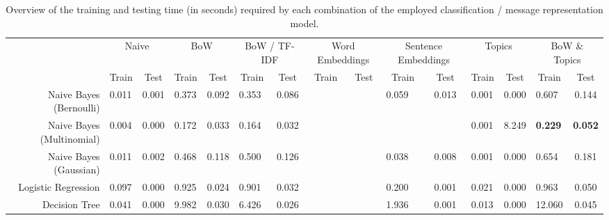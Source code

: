 \documentclass[letterpaper]{article}
\begin{document}
\begin{landscape}
	\begin{table}[t!]
		\centering
		\caption{Overview of the training and testing time (in seconds) required by each combination of the employed classification / message representation model.}
		\label{tb: time}
		\begin{tabular}{@{}r|lclclclclclclc@{}}
			\toprule
			                          & \multicolumn{2}{c}{Naive}         & \multicolumn{2}{c}{BoW}           & \multicolumn{2}{c}{BoW / TF-IDF}  & \multicolumn{2}{c}{Word Embeddings} & \multicolumn{2}{c}{Sentence Embeddings} & \multicolumn{2}{c}{Topics}             & \multicolumn{2}{c}{BoW \& Topics}            \\
			\multicolumn{1}{l|}{}     & \multicolumn{1}{c}{Train} & Test  & \multicolumn{1}{c}{Train} & Test  & \multicolumn{1}{c}{Train} & Test  & \multicolumn{1}{c}{Train} & Test    & \multicolumn{1}{c}{Train}     & Test    & \multicolumn{1}{c}{Train}    & Test    & \multicolumn{1}{c}{Train}    & Test          \\ \midrule
			Naive Bayes (Bernoulli)   & 0.011                     & 0.001 & 0.373                     & 0.092 & 0.353                     & 0.086 &                           &         & 0.059                         & 0.013   & 0.001                        & 0.000   & 0.607                        & 0.144         \\
			Naive Bayes (Multinomial) & 0.004                     & 0.000 & 0.172                     & 0.033 & 0.164                     & 0.032 &                           &         &                               &         & 0.001                        & 8.249   & \textbf{0.229}               & \textbf{0.052}\\
			Naive Bayes (Gaussian)    & 0.011                     & 0.002 & 0.468                     & 0.118 & 0.500                     & 0.126 &                           &         & 0.038                         & 0.008   & 0.001                        & 0.000   & 0.654                        & 0.181         \\
			Logistic Regression       & 0.097                     & 0.000 & 0.925                     & 0.024 & 0.901                     & 0.032 &                           &         & 0.200                         & 0.001   & 0.021                        & 0.000   & 0.963                        & 0.050         \\
			Decision Tree             & 0.041                     & 0.000 & 9.982                     & 0.030 & 6.426                     & 0.026 &                           &         & 1.936                         & 0.001   & 0.013                        & 0.000   & 12.060                       & 0.045         \\

\end{tabular}
\end{table}
\end{landscape}
\end{document}
